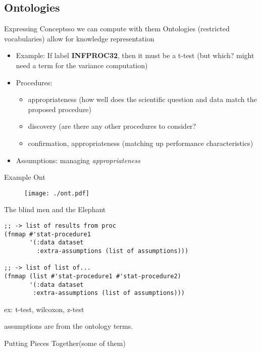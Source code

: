 \documentclass{beamer}
\begin{document}
\subsection{Ontologies}

\begin{frame}{Expressing Concepts}{so we can compute with them}
  Ontologies (restricted vocabularies) allow for knowledge representation
  \begin{itemize}
  \item Example:  If label \textbf{INFPROC32}, then it must be a
    t-test (but which? might need a term for the variance computation)
  \item Procedures:
    \begin{itemize}
    \item appropriateness (how well does the scientific question and data match
      the proposed procedure)
    \item discovery (are there any other procedures to consider?
    \item confirmation, appropriateness (matching up performance characteristics)
    \end{itemize}
  \item Assumptions: managing \textit{appropriateness}
  \end{itemize}
\end{frame}

\begin{frame}{Example Ont}
  \begin{figure}
    \centering
    \texttt{[image: ./ont.pdf]}
  \end{figure}
\end{frame}

\begin{frame}[fragile]{The blind men and the Elephant}
\begin{verbatim}
;; -> list of results from proc
(fnmap #'stat-procedure1
       '(:data dataset
         :extra-assumptions (list of assumptions)))

;; -> list of list of...
(fnmap (list #'stat-procedure1 #'stat-procedure2)
       '(:data dataset
        :extra-assumptions (list of assumptions)))
\end{verbatim}
ex: t-test, wilcoxon, z-test

assumptions are from the ontology terms.
\end{frame}

\begin{frame}{Putting Pieces Together}{(some of them)}
\end{frame}
\end{document}
